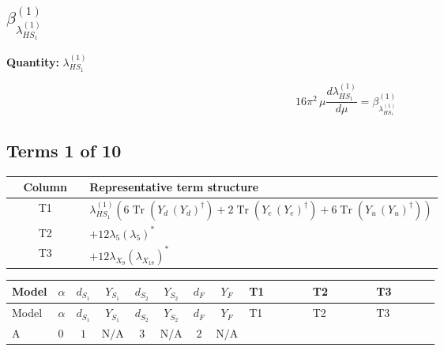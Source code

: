 \documentclass[8pt]{article}
\begin{document}
\begin{landscape}
\section*{$\beta_{\lambda_{HS_1}^{(1)}}^{(1)}$}
\noindent\textbf{Quantity: }$\lambda_{HS_1}^{(1)}$\par\smallskip
\[16\pi^2\,\mu\frac{d \lambda_{HS_1}^{(1)}}{d\mu}=\beta_{\lambda_{HS_1}^{(1)}}^{(1)}\]
\subsection*{Terms 1 of 10}
\begin{center}
\begin{tabular}{@{}c >{\raggedright\arraybackslash}p{0.82\linewidth}@{}}
\toprule
Column & Representative term structure \\
\midrule
T1 & \(\displaystyle {\lambda_{HS_1}^{(1)}} (6 \operatorname{Tr}\!\left({Y_d}\,\left({Y_d}\right)^{\dagger}\right)+2 \operatorname{Tr}\!\left({Y_e}\,\left({Y_e}\right)^{\dagger}\right)+6 \operatorname{Tr}\!\left({Y_u}\,\left({Y_u}\right)^{\dagger}\right))\) \\
\midrule
T2 & \(\displaystyle +12 {\lambda_5} \left({\lambda_5}\right)^{*}\) \\
\midrule
T3 & \(\displaystyle +12 {\lambda_{X_{9}}} \left({\lambda_{X_{18}}}\right)^{*}\) \\
\midrule
\bottomrule
\end{tabular}
\end{center}
\smallskip
\tiny
\begin{longtable}{@{}llcccccc >{\raggedright\arraybackslash}p{0.21\linewidth} >{\raggedright\arraybackslash}p{0.21\linewidth} >{\raggedright\arraybackslash}p{0.21\linewidth}@{}}
\toprule
Model & $\alpha$ & $d_{S_1}$ & $Y_{S_1}$ & $d_{S_2}$ & $Y_{S_2}$ & $d_F$ & $Y_F$ & T1 & T2 & T3 \\
\midrule
\endfirsthead
\toprule
Model & $\alpha$ & $d_{S_1}$ & $Y_{S_1}$ & $d_{S_2}$ & $Y_{S_2}$ & $d_F$ & $Y_F$ & T1 & T2 & T3 \\
\midrule
\endhead
A & $0$ & $1$ & $\text{N/A}$ & $3$ & $\text{N/A}$ & $2$ & $\text{N/A}$ & \scriptsize\adjustbox{max width=\linewidth}{$\begin{gathered} {\lambda_{HS_1}^{(1)}} (6 \operatorname{Tr}\!\left({Y_d}\,\left({Y_d}\right)^{\dagger}\right)+2 \operatorname{Tr}\!\left({Y_e}\,\left({Y_e}\right)^{\dagger}\right)+6 \operatorname{Tr}\!\left({Y_u}\,\left({Y_u}\right)^{\dagger}\right))\end{gathered}$} & \scriptsize\adjustbox{max width=\linewidth}{$\begin{gathered} +12 {\lambda_5} \left({\lambda_5}\right)^{*}\end{gathered}$} & \scriptsize\adjustbox{max width=\linewidth}{$\begin{gathered} +12 {\lambda_{X_{9}}} \left({\lambda_{X_{18}}}\right)^{*}\end{gathered}$} \\

\end{longtable}
\end{landscape}
\end{document}
